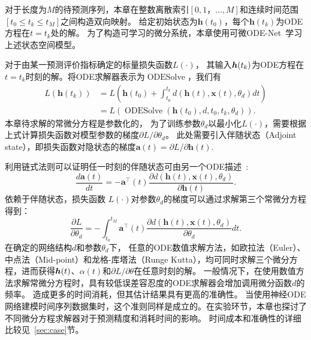 对于长度为$M$的待预测序列，本章在整数离散索引$[0,1，\dots,M]$和连续时间范围$[t_0\leq t_k \leq t_{M}]$之间构造双向映射。
给定初始状态为$\boldsymbol{h}(t_0)$，每个$\boldsymbol{h}(t_k)$为ODE方程在$t=t_k$处的解。
为了构造可学习的微分系统，本章使用可微ODE-Net~\cite{NIPS2018_7892}学习上述状态空间模型。

对于由某一预测评价指标确定的标量损失函数$L(\cdot)$，
其输入$\boldsymbol{h}(t_k)$为ODE方程在$t=t_k$时刻的解。将ODE求解器表示为$\operatorname{ODESolve}$，我们有
\begin{align}
\label{equ:loss_ode_solver}
L\left(\boldsymbol{h}\left(t_{k}\right)\right)&=L\left(\boldsymbol{h}\left(t_{0}\right)+\int_{t_{0}}^{t_{k}} d(\boldsymbol{h}(t), \boldsymbol x(t), \theta_d) d t\right)\nonumber\\
&=L\left(\operatorname{ODESolve}\left(\boldsymbol{h}\left(t_{0}\right), d, t_{0}, t_{k}, \theta_d \right)\right).
\end{align}
本章待求解的常微分方程是参数化的，
为了训练参数$\theta _d$以最小化$L(\cdot)$，需要根据上式计算损失函数对模型参数的梯度$\partial L / \partial \theta _d$。
此处需要引入伴随状态（Adjoint state），即损失函数对隐状态的梯度$\boldsymbol{a}(t)=\partial L / \partial \boldsymbol{h}(t)$.

利用链式法则可以证明任一时刻的伴随状态可由另一个ODE描述~\cite{NIPS2018_7892}:
\begin{equation}
\label{equ:ode_at}
\frac{d \boldsymbol{a}(t)}{d t}=-\boldsymbol{a}^{\top}(t) \frac{\partial d(\boldsymbol{h}(t), \boldsymbol x(t), \theta_d)}{\partial \boldsymbol{h}(t)}.
\end{equation}
依赖于伴随状态，损失函数 $L(\cdot)$对参数$\theta _d$的梯度可以通过求解第三个常微分方程得到：
\begin{equation}
\label{equ:grad_ode}
\frac{\partial L}{\partial \theta _d}=-\int_{t_0}^{t_{M}} \boldsymbol{a}^{\top}(t) \frac{\partial d(\boldsymbol{h}(t), \boldsymbol x(t), \theta _d)}{\partial \theta_d} d t.
\end{equation}
在确定的网络结构$d$和参数$\theta _d$下，
任意的ODE数值求解方法，如欧拉法（Euler）、中点法（Mid-point）和龙格-库塔法（Runge Kutta），均可同时求解三个微分方程，进而获得$\boldsymbol h (t)$、$\alpha (t)$和${\partial L}/{\partial \theta}$在任意时刻的解。
一般情况下，在使用数值方法求解常微分方程时，具有较低误差容忍度的ODE求解器会增加调用微分函数$d$的频率。
造成更多的时间消耗，但其估计结果具有更高的准确性。
当使用神经ODE网络建模时间序列数据集时，这个准则同样是成立的。在实验环节，本章也探讨了不同微分方程求解器对于预测精度和消耗时间的影响。
时间成本和准确性的详细比较见~\ref{sec:case}节。

